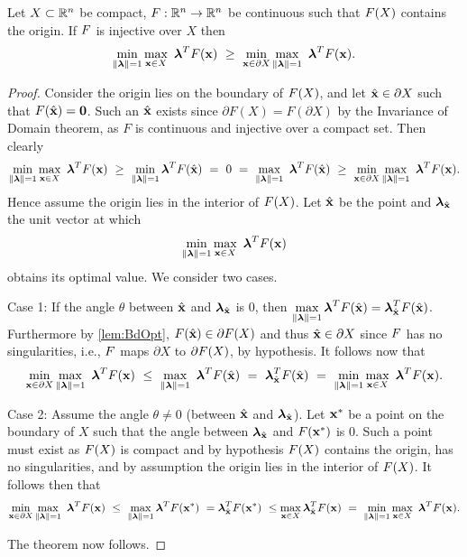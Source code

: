 \begin{thm} 
  \label{thm:MainIneq}
  Let $X\subset\mathbb{R}^n$ be compact, $F:\mathbb{R}^n\rightarrow\mathbb{R}^n$ be continuous such that $F(X)$ contains the origin. 
  If $F$ is injective over $X$ then
  \[
  \min\limits_{\lVert\boldsymbol{\lambda}\rVert=1}\max\limits_{\mathbf{x}\in X}\ \boldsymbol{\lambda}^TF(\mathbf{x}) ~\geq~ \min\limits_{\mathbf{x}\in \partial X} \max\limits_{\lVert\boldsymbol{\lambda}\rVert=1}\ \boldsymbol{\lambda}^TF(\mathbf{x}).
  \]
%
  \begin{proof}
    Consider the origin lies on the boundary of $F(X)$, and let $\hat{\mathbf{x}} \in \partial X$ such that $F(\hat{\mathbf{x}})=\mathbf{0}$. 
    Such an $\hat{\mathbf{x}}$ exists since $\partial F(X) = F(\partial X)$ by the Invariance of Domain theorem, as $F$ is continuous and injective over a compact set. 
    Then  clearly
    \[
    \min\limits_{\norm{\vlambda}=1}\max\limits_{\vx\in X}\ \vlambda^T\vF(\vx) ~\geq~
    \min\limits_{\norm{\vlambda}=1}\vlambda^T\vF(\hat{\vx}) ~=~ 0 ~=~
    \max\limits_{\norm{\vlambda}=1}\ \vlambda^T\vF(\hat{\vx}) ~\geq~
    \min\limits_{\vx\in \partial X}\max\limits_{\norm{\vlambda}=1}\ \vlambda^T\vF(\vx).
\]
Hence assume the origin lies in the interior of $F(X)$.
Let $\hat{\mathbf{x}}$ be the point and $\boldsymbol{\lambda}_{\hat{\mathbf{x}}}$ the unit vector at which
\[
\min\limits_{\lVert\boldsymbol{\lambda}\rVert=1}\max\limits_{\mathbf{x}\in X}\ \boldsymbol{\lambda}^TF(\mathbf{x})
\]
obtains its optimal value.
We consider two cases.

Case 1: If the angle $\theta$ between $\hat{\mathbf{x}}$ and $\boldsymbol{\lambda}_{\hat{\mathbf{x}}}$ is $0$, then $\displaystyle \max\limits_{\lVert\boldsymbol{\lambda}\rVert=1}\boldsymbol{\lambda}^TF(\hat{\mathbf{x}}) = \boldsymbol{\lambda}_{\hat{\mathbf{x}}}^TF(\hat{\mathbf{x}})$. 
Furthermore by \cref{lem:BdOpt}, $F(\hat{\mathbf{x}}) \in \partial F(X)$ and thus $\hat{\mathbf{x}}\in \partial X$ since $F$ has no singularities, i.e., $F$ maps $\partial X$ to $\partial F(X)$, by hypothesis. 
It follows now that
\[
\min\limits_{\vx\in \partial X}\max\limits_{\norm{\vlambda}=1}\ \vlambda^T\vF(\vx) ~\leq~
\max\limits_{\norm{\vlambda}=1}\ \vlambda^T\vF(\hat{\vx}) ~=~
\vlambda_{\hat{\vx}}^T\vF(\hat{\vx}) ~=~
\min\limits_{\norm{\vlambda}=1}\max\limits_{\vx\in X}\ \vlambda^T\vF(\vx).
\]

Case 2: Assume the angle $\theta \neq 0$ (between $\hat{\mathbf{x}}$ and $\boldsymbol{\lambda}_{\hat{\mathbf{x}}}$). 
Let $\mathbf{x}^*$ be a point on the boundary of $X$ such that the angle between $\boldsymbol{\lambda}_{\hat{\mathbf{x}}}$ and $F(\mathbf{x}^*)$ is 0. 
Such a point must exist as $F(X)$ is compact and by hypothesis $F(X)$ contains the origin, has no singularities,
and by assumption the origin lies in the interior of $F(X)$. 
It follows then that
\[
\min\limits_{\vx\in \partial X}\max\limits_{\norm{\vlambda}=1}\ \vlambda^T\vF(\vx) ~\leq~
\max\limits_{\norm{\vlambda}=1}\vlambda^T \vF(\vx^*) ~=
\vlambda_{\hat{\vx}}^T\vF(\vx^*) ~\leq
\max\limits_{\vx\in X}\vlambda_{\hat{\vx}}^T\vF(\vx) ~=~
\min\limits_{\norm{\vlambda}=1}\max\limits_{\vx\in X}\ \vlambda^T\vF(\vx).
\]

The theorem now follows.
\end{proof}
\end{thm}

